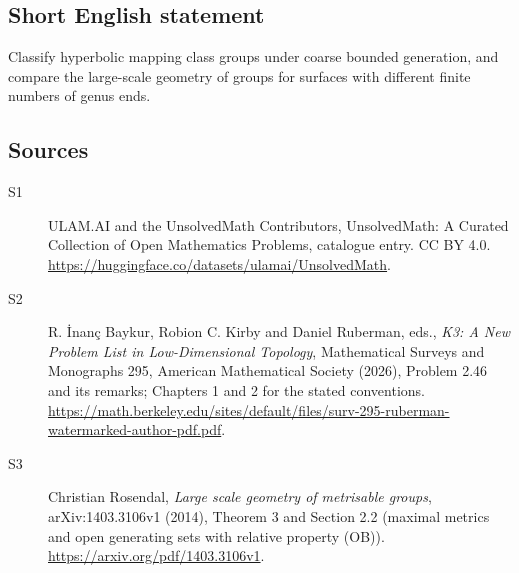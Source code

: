 \documentclass[11pt]{article}
\begin{document}
\subsection{Short English statement}
Classify hyperbolic mapping class groups under coarse bounded generation, and compare the large-scale geometry of groups for surfaces with different finite numbers of genus ends.
\subsection{Sources}
\begin{description}
\item[\hypertarget{source:statement:1}{S1}] ULAM.AI and the UnsolvedMath Contributors, UnsolvedMath: A Curated Collection of Open Mathematics Problems, catalogue entry. CC BY 4.0. \url{https://huggingface.co/datasets/ulamai/UnsolvedMath}.
\item[\hypertarget{source:statement:2}{S2}] R. İnanç Baykur, Robion C. Kirby and Daniel Ruberman, eds., \emph{K3: A New Problem List in Low-Dimensional Topology}, Mathematical Surveys and Monographs 295, American Mathematical Society (2026), Problem 2.46 and its remarks; Chapters 1 and 2 for the stated conventions. \url{https://math.berkeley.edu/sites/default/files/surv-295-ruberman-watermarked-author-pdf.pdf}.
\item[\hypertarget{source:statement:3}{S3}] Christian Rosendal, \emph{Large scale geometry of metrisable groups}, arXiv:1403.3106v1 (2014), Theorem 3 and Section 2.2 (maximal metrics and open generating sets with relative property (OB)). \url{https://arxiv.org/pdf/1403.3106v1}.
\end{description}
\label{end:statement}
\end{document}
